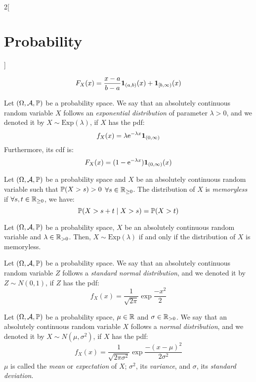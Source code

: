 \documentclass[../../../main_math.tex]{subfiles}
\begin{document}
\begin{multicols}{2}[\section{Probability}]
\begin{definition}
    $$F_X(x)=\frac{x-a}{b-a}\boldsymbol{\mathrm{1}}_{(a,b)}(x)+\boldsymbol{\mathrm{1}}_{[b,\infty)}(x)$$
  \end{definition}
  \begin{definition}
    Let $(\Omega,\mathcal{A},\mathbb{P})$ be a probability space. We say that an absolutely continuous random variable $X$ follows an \emph{exponential distribution} of parameter $\lambda>0$, and we denoted it by $X\sim \text{Exp}(\lambda)$, if $X$ has the pdf: $$f_X(x)=\lambda\mathrm{e}^{-\lambda x}\boldsymbol{\mathrm{1}}_{(0,\infty)}$$ Furthermore, its cdf is:
    $$F_X(x)=(1-\mathrm{e}^{-\lambda x})\boldsymbol{\mathrm{1}}_{(0,\infty)}(x)$$
  \end{definition}
  \begin{definition}
    Let $(\Omega,\mathcal{A},\mathbb{P})$ be a probability space and $X$ be an absolutely continuous random variable such that $\mathbb{P}(X >s)>0$ $\forall s\in\mathbb{R}_{\geq 0}$. The distribution of $X$ is \emph{memoryless} if $\forall s,t\in\mathbb{R}_{\geq 0}$, we have: $$\mathbb{P}(X>s+t\mid X >s)=\mathbb{P}(X>t)$$
  \end{definition}
  \begin{proposition}
    Let $(\Omega,\mathcal{A},\mathbb{P})$ be a probability space, $X$ be an absolutely continuous random variable and $\lambda\in\mathbb{R}_{>0}$. Then, $X\sim\text{Exp}(\lambda)$ if and only if the distribution of $X$ is memoryless.
  \end{proposition}
  \begin{definition}
    Let $(\Omega,\mathcal{A},\mathbb{P})$ be a probability space. We say that an absolutely continuous random variable $Z$ follows a \emph{standard normal distribution}, and we denoted it by $Z\sim N(0,1)$, if $Z$ has the pdf: $$f_X(x)=\frac{1}{\sqrt{2\pi}}\exp{\frac{-x^2}{2}}$$
  \end{definition}
  \begin{definition}
    Let $(\Omega,\mathcal{A},\mathbb{P})$ be a probability space, $\mu\in\mathbb{R}$ and $\sigma\in\mathbb{R}_{>0}$. We say that an absolutely continuous random variable $X$ follows a \emph{normal distribution}, and we denoted it by $X\sim N(\mu,\sigma^2)$, if $X$ has the pdf: $$f_X(x)=\frac{1}{\sqrt{2\pi\sigma^2}}\exp{\frac{-{(x-\mu)}^2}{2\sigma^2}}$$ $\mu$ is called the \emph{mean} or \emph{expectation} of $X$; $\sigma^2$, its \emph{variance}, and $\sigma$, its \emph{standard deviation}.
  \end{definition}
  \begin{center}
    \begin{minipage}{\linewidth}

\end{minipage}
\end{center}
\end{multicols}
\end{document}
